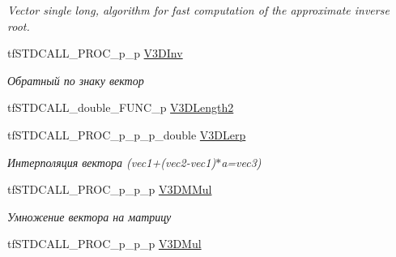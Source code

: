 \begin{DoxyCompactItemize}
\begin{DoxyCompactList}\small\item\em Vector single long, algorithm for fast computation of the approximate inverse root. \end{DoxyCompactList}\item 
\hypertarget{structs_functions_vector_c_p_u_a81806d3b46573d5192f172604ee341c7}{tf\-S\-T\-D\-C\-A\-L\-L\-\_\-\-P\-R\-O\-C\-\_\-p\-\_\-p \hyperlink{structs_functions_vector_c_p_u_a81806d3b46573d5192f172604ee341c7}{V3\-D\-Inv}}\label{structs_functions_vector_c_p_u_a81806d3b46573d5192f172604ee341c7}

\begin{DoxyCompactList}\small\item\em Обратный по знаку вектор \end{DoxyCompactList}\item 
tf\-S\-T\-D\-C\-A\-L\-L\-\_\-double\-\_\-\-F\-U\-N\-C\-\_\-p \hyperlink{structs_functions_vector_c_p_u_a4448501858c25e75998fe9a7332c523e}{V3\-D\-Length2}
\item 
\hypertarget{structs_functions_vector_c_p_u_aeac473452467f19cb531b9884fea9cc0}{tf\-S\-T\-D\-C\-A\-L\-L\-\_\-\-P\-R\-O\-C\-\_\-p\-\_\-p\-\_\-p\-\_\-double \hyperlink{structs_functions_vector_c_p_u_aeac473452467f19cb531b9884fea9cc0}{V3\-D\-Lerp}}\label{structs_functions_vector_c_p_u_aeac473452467f19cb531b9884fea9cc0}

\begin{DoxyCompactList}\small\item\em Интерполяция вектора (vec1+(vec2-\/vec1)$\ast$a=vec3) \end{DoxyCompactList}\item 
\hypertarget{structs_functions_vector_c_p_u_a69da0921b70044c3754ed558e56f7dde}{tf\-S\-T\-D\-C\-A\-L\-L\-\_\-\-P\-R\-O\-C\-\_\-p\-\_\-p\-\_\-p \hyperlink{structs_functions_vector_c_p_u_a69da0921b70044c3754ed558e56f7dde}{V3\-D\-M\-Mul}}\label{structs_functions_vector_c_p_u_a69da0921b70044c3754ed558e56f7dde}

\begin{DoxyCompactList}\small\item\em Умножение вектора на матрицу \end{DoxyCompactList}\item 
\hypertarget{structs_functions_vector_c_p_u_a86db79f1663c2096c45fc4afdb091ed9}{tf\-S\-T\-D\-C\-A\-L\-L\-\_\-\-P\-R\-O\-C\-\_\-p\-\_\-p\-\_\-p \hyperlink{structs_functions_vector_c_p_u_a86db79f1663c2096c45fc4afdb091ed9}{V3\-D\-Mul}}\label{structs_functions_vector_c_p_u_a86db79f1663c2096c45fc4afdb091ed9}


\end{DoxyCompactItemize}
